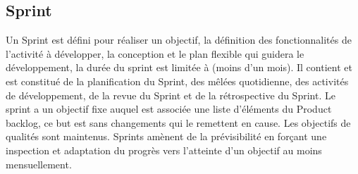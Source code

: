 \subsection{Sprint}

 Un Sprint est défini pour réaliser un objectif, la définition des fonctionnalités de l’activité à développer, la conception et le plan flexible qui guidera le développement, la durée du sprint est limitée à  (moins d’un mois).
 Il contient et est constitué de la planification du Sprint, des mêlées quotidienne, des activités de développement, de la revue du Sprint et de la rétrospective du Sprint.
 Le sprint a un objectif fixe auquel est associée une liste d’éléments du Product backlog, ce but est sans changements qui le remettent en cause. Les objectifs de qualités sont maintenus.
 Sprints amènent de la prévisibilité en forçant une inspection et adaptation du progrès vers l’atteinte d’un objectif au moins mensuellement.